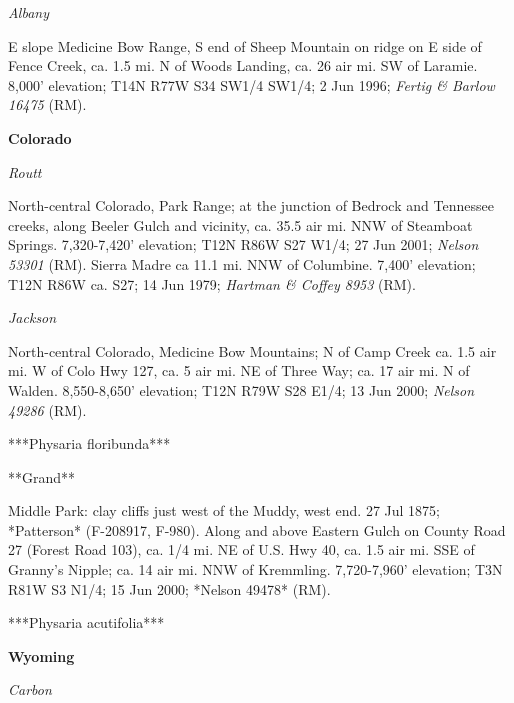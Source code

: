 \textit{Albany}

E slope Medicine Bow Range, S end of Sheep Mountain on ridge on E side of Fence Creek, ca. 1.5 mi. N of Woods Landing, ca. 26 air mi. SW of Laramie. 8,000' elevation; T14N R77W S34 SW1/4 SW1/4; 2 Jun 1996; \textit{Fertig \& Barlow 16475} (RM).

\textbf{Colorado} 

\textit{Routt}

North-central Colorado, Park Range; at the junction of Bedrock and Tennessee creeks, along Beeler Gulch and vicinity, ca. 35.5 air mi. NNW of Steamboat Springs. 7,320-7,420' elevation; T12N R86W S27 W1/4; 27 Jun 2001; \textit{Nelson 53301} (RM).  Sierra Madre ca 11.1 mi. NNW of Columbine.  7,400' elevation; T12N R86W ca. S27; 14 Jun 1979; \textit{Hartman \& Coffey 8953} (RM). 

\textit{Jackson}

North-central Colorado, Medicine Bow Mountains; N of Camp Creek ca. 1.5 air mi. W of Colo Hwy 127, ca. 5 air mi. NE of Three Way; ca. 17 air mi. N of Walden.  8,550-8,650' elevation; T12N R79W S28 E1/4; 13 Jun 2000; \textit{Nelson 49286} (RM).

***Physaria floribunda***

**Grand**

Middle Park: clay cliffs just west of the Muddy, west end. 27 Jul 1875; *Patterson* (F-208917, F-980).  Along and above Eastern Gulch on County Road 27 (Forest Road 103), ca. 1/4 mi. NE of U.S. Hwy 40, ca. 1.5 air mi. SSE of Granny's Nipple; ca. 14 air mi. NNW of Kremmling. 7,720-7,960' elevation; T3N R81W S3 N1/4; 15 Jun 2000; *Nelson 49478* (RM).  




***Physaria acutifolia***

\textbf{Wyoming} %

\textit{Carbon}




